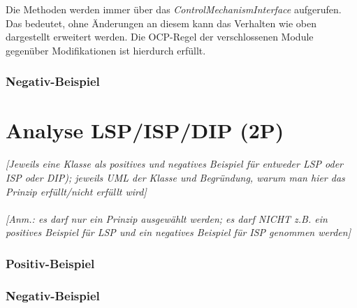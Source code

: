 Die Methoden werden immer über das \emph{ControlMechanismInterface} aufgerufen. Das bedeutet, ohne Änderungen an diesem kann das Verhalten wie oben dargestellt erweitert werden. Die OCP-Regel der verschlossenen Module gegenüber Modifikationen ist hierdurch erfüllt.

\subsubsection{Negativ-Beispiel}

\section{Analyse LSP/ISP/DIP (2P)}
\emph{[Jeweils eine Klasse als positives und negatives Beispiel für entweder LSP oder ISP oder DIP); jeweils
UML der Klasse und Begründung, warum man hier das Prinzip erfüllt/nicht erfüllt wird]}
\\
\\
\emph{[Anm.: es darf nur ein Prinzip ausgewählt werden; es darf NICHT z.B. ein positives Beispiel für LSP
und ein negatives Beispiel für ISP genommen werden]}

\subsubsection{Positiv-Beispiel}
\subsubsection{Negativ-Beispiel}